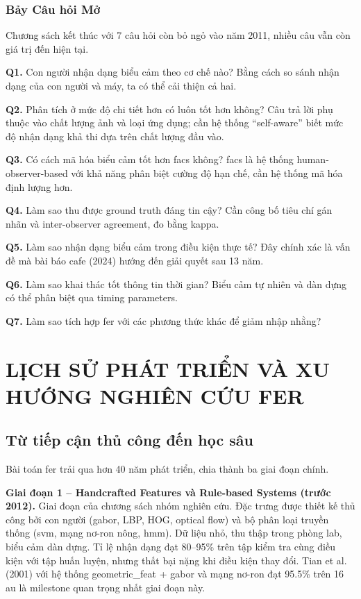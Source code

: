 \documentclass[12pt,a4paper]{article}
\let\oldtextbf\textbf
\renewcommand{\textbf}[1]{\oldtextbf{\textcolor{hcmublue}{#1}}}
\begin{document}
\subsubsection{Bảy Câu hỏi Mở}

Chương sách kết thúc với 7 câu hỏi còn bỏ ngỏ vào năm 2011, nhiều câu vẫn còn giá trị đến hiện tại.

\textbf{Q1.} Con người nhận dạng biểu cảm theo cơ chế nào? Bằng cách so sánh nhận dạng của con người và máy, ta có thể cải thiện cả hai.

\textbf{Q2.} Phân tích ở mức độ chi tiết hơn có luôn tốt hơn không? Câu trả lời phụ thuộc vào chất lượng ảnh và loại ứng dụng; cần hệ thống ``self-aware'' biết mức độ nhận dạng khả thi dựa trên chất lượng đầu vào.

\textbf{Q3.} Có cách mã hóa biểu cảm tốt hơn \gls{facs} không? \gls{facs} là hệ thống human-observer-based với khả năng phân biệt cường độ hạn chế, cần hệ thống mã hóa định lượng hơn.

\textbf{Q4.} Làm sao thu được ground truth đáng tin cậy? Cần công bố tiêu chí gán nhãn và inter-observer agreement, đo bằng \gls{kappa}.

\textbf{Q5.} Làm sao nhận dạng biểu cảm trong điều kiện thực tế? Đây chính xác là vấn đề mà bài báo \gls{cafe} (2024) hướng đến giải quyết sau 13 năm.

\textbf{Q6.} Làm sao khai thác tốt thông tin thời gian? Biểu cảm tự nhiên và dàn dựng có thể phân biệt qua timing parameters.

\textbf{Q7.} Làm sao tích hợp \gls{fer} với các phương thức khác để giảm nhập nhằng?


\section{LỊCH SỬ PHÁT TRIỂN VÀ XU HƯỚNG NGHIÊN CỨU FER}

\subsection{Từ tiếp cận thủ công đến học sâu}

Bài toán \gls{fer} trải qua hơn 40 năm phát triển, chia thành ba giai đoạn chính.

\textbf{Giai đoạn 1 -- Handcrafted Features và Rule-based Systems (trước 2012).}
Giai đoạn của chương sách nhóm nghiên cứu. Đặc trưng được thiết kế thủ công bởi con người (\gls{gabor}, LBP, HOG, optical flow) và bộ phân loại truyền thống (\gls{svm}, mạng nơ-ron nông, \gls{hmm}). Dữ liệu nhỏ, thu thập trong phòng lab, biểu cảm dàn dựng. Tỉ lệ nhận dạng đạt 80--95\% trên tập kiểm tra cùng điều kiện với tập huấn luyện, nhưng thất bại nặng khi điều kiện thay đổi. Tian et al. (2001) với hệ thống \gls{geometric_feat} + \gls{gabor} và mạng nơ-ron đạt 95.5\% trên 16 \gls{au} là milestone quan trọng nhất giai đoạn này.
\end{document}
